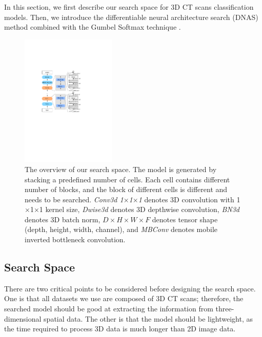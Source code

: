 \documentclass[letterpaper]{article}
\begin{document}


In this section, we first describe our search space for 3D CT scans classification models. Then, we introduce the differentiable neural architecture search (DNAS) method combined with the Gumbel Softmax technique \cite{Gumbel_Softmax,gdas}.


\begin{figure}[!ht]
    \centering
    \includegraphics[width=0.4\textwidth, height=0.45\textwidth]{images/mnasnet_new.pdf}
    \caption{The overview of our search space. The model is generated by stacking a predefined number of cells. Each cell contains different number of blocks, and the block of different cells is different and needs to be searched. \textit{Conv3d 1$\times$1$\times$1} denotes 3D convolution with 1$\times$1$\times$1 kernel size, \textit{Dwise3d} denotes 3D depthwise convolution, \textit{BN3d} denotes 3D batch norm, $D\times H\times W\times F$ denotes tensor shape (depth, height, width, channel), and \textit{MBConv} denotes mobile inverted bottleneck convolution.}
    \label{fig:search_space}
    \vspace{-10px}
\end{figure}


\subsection{Search Space}

There are two critical points to be considered before designing the search space. One is that all datasets we use are composed of 3D CT scans; therefore, the searched model should be good at extracting the information from three-dimensional spatial data. The other is that the model should be lightweight, as the time required to process 3D data is much longer than 2D image data. 
\end{document}
